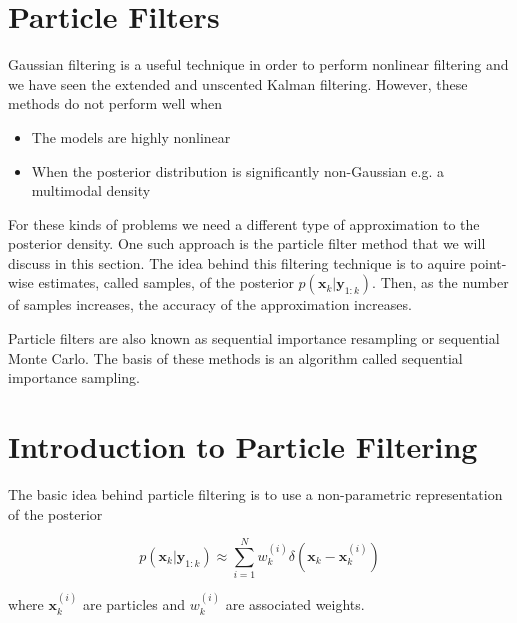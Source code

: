 \section{Particle Filters}
\label{particle_filters}

Gaussian filtering is a useful technique in order to perform nonlinear filtering and we have seen
the extended and unscented Kalman filtering. However, these methods do not perform well when

\begin{itemize}
\item The models are highly nonlinear
\item When the posterior distribution is significantly non-Gaussian e.g. a multimodal density
\end{itemize}


For these kinds of problems we need a different type of approximation to the posterior density. One such approach is the particle filter
method that we will discuss in this section. The idea behind this filtering technique is  to aquire point-wise
estimates, called samples, of the posterior $p(\mathbf{x}_k | \mathbf{y}_{1:k})$. Then, as the number of samples increases,
the accuracy of the approximation increases. 


\begin{framed}
\theoremstyle{remark}
\begin{remark}{}

Particle filters are also known as sequential importance resampling or sequential Monte Carlo.
The basis of these methods is an algorithm called  sequential importance sampling.
\end{remark}
\end{framed}

\section{Introduction to Particle Filtering }
\label{particle_filter_introduction}

The basic idea behind particle filtering is to use a non-parametric representation of the posterior

\begin{equation}
p(\mathbf{x}_k | \mathbf{y}_{1:k}) \approx \sum_{i=1}^N w_{k}^{(i)} \delta (\mathbf{x}_k -\mathbf{x}_{k}^{(i)})
\end{equation}

where $\mathbf{x}_{k}^{(i)}$ are particles and $w_{k}^{(i)}$ are associated weights.

